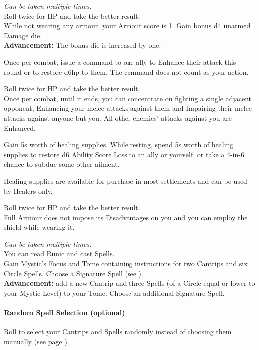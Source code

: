 \documentclass[itdr]{subfiles}
\begin{document}
\vfill
{} {\slshape Can be taken multiple times.}\\
Roll twice for HP and take the better result.\\
While not wearing any armour, your Armour score is 1. Gain bonus d4 unarmed Damage die.\\
\textbf{Advancement:} The bonus die is increased by one.

\vfill
{}
Once per combat, issue a command to one ally to Enhance their attack this round or to restore d6hp to them. The command does not count as your action.

\break

 Roll twice for HP and take the better result.\\
Once per combat, until it ends, you can concentrate on fighting a single adjacent opponent, Enhancing your melee attacks against them and Impairing their melee attacks against anyone but you. All other \mbox{enemies'} attacks against you are Enhanced.

\vfill
{}
Gain 5s worth of healing supplies.
While resting, spend 5s worth of healing supplies to restore d6 Ability Score Loss to an ally or yourself, or take a 4-in-6 chance to subdue some other ailment.

Healing supplies are available for purchase in most settlements and can be used by Healers only.

\vfill
{}
 Roll twice for HP and take the better result.\\
Full Armour does not impose its Disadvantages on you and you can employ the shield while wearing it.

\vfill
{}
 {\slshape Can be taken multiple times.}\\
You can read Runic and cast Spells.\\
Gain Mystic's Focus and Tome containing instructions for two Cantrips and six  Circle Spells. Choose a Signature Spell (see \textbf{}).\\
\textbf{Advancement:} add a new Cantrip and three Spells (of a Circle equal or lower to your Mystic Level) to your Tome. Choose an additional Signature Spell.
\begin{dbox}
	\paragraph{Random Spell Selection (optional)}
	Roll to select your Cantrips and Spells randomly instead of choosing them manually (see page \pageref{random_spells}).\vspace{-1em}
\end{dbox}
\end{document}
